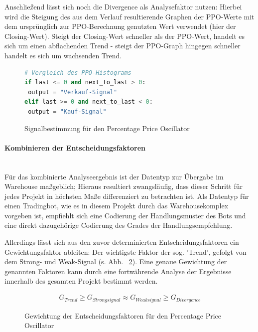 Anschließend lässt sich noch die Divergence als Analysefaktor nutzen: Hierbei wird die Steigung des aus dem Verlauf resultierende Graphen der PPO-Werte mit dem ursprünglich zur PPO-Berechnung genutzten Wert verwendet (hier der Closing-Wert). Steigt der Closing-Wert schneller als der PPO-Wert, handelt es sich um einen abflachenden Trend - steigt der PPO-Graph hingegen schneller handelt es sich um wachsenden Trend. \cite{tvWikiPpo,inoPedPpo}

\begin{figure}[!ht]
\begin{lstlisting}[language=Python]
# Vergleich des PPO-Histograms
if last <= 0 and next_to_last > 0:
 output = "Verkauf-Signal"
elif last >= 0 and next_to_last < 0:
 output = "Kauf-Signal"
\end{lstlisting}
\caption{Signalbestimmung für den Percentage Price Oscillator}
\label{fig:signalbestimmung_ppo}
\end{figure}

\paragraph{Kombinieren der Entscheidungsfaktoren}~\\
\label{subsubsec_analysis_comb_ppo}
Für das kombinierte Analyseergebnis ist der Datentyp zur Übergabe im Warehouse maßgeblich; Hieraus resultiert zwangsläufig, dass dieser Schritt für jedes Projekt in höchsten Maße differenziert zu betrachten ist. Als Datentyp für einen Tradingbot, wie es in diesem Projekt durch das Warehousekomplex vorgeben ist, empfiehlt sich eine Codierung der Handlungsmuster des Bots und eine direkt dazugehörige Codierung des Grades der Handlungsempfehlung.

Allerdings lässt sich aus den zuvor determinierten Entscheidungsfaktoren ein Gewichtungsfaktor ableiten: Der wichtigste Faktor der sog. 'Trend', gefolgt von dem Strong- und Weak-Signal (s. Abb. ~\ref{fig:faktorenhierrachie_ppo}). Eine genaue Gewichtung der genannten Faktoren kann durch eine fortwährende Analyse der Ergebnisse innerhalb des gesamten Projekt bestimmt werden. \cite{tvWikiPpo,inoPedPpo}

\begin{figure}[!ht]
\begin{eqnarray}
G_{Trend} \geq  G_{Strongsignal} \approx G_{Weaksignal} \geq G_{Divergence}\nonumber
\end{eqnarray}
\caption{Gewichtung der Entscheidungsfaktoren für den Percentage Price Oscillator}
\label{fig:faktorenhierrachie_ppo}
\end{figure}

